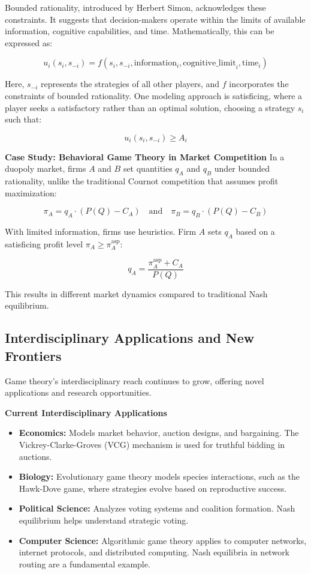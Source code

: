 \documentclass[12pt]{book} %
\begin{document}
Bounded rationality, introduced by Herbert Simon, acknowledges these constraints. It suggests that decision-makers operate within the limits of available information, cognitive capabilities, and time. Mathematically, this can be expressed as:

\[
u_i(s_i, s_{-i}) = f(s_i, s_{-i}, \text{information}_i, \text{cognitive\_limit}_i, \text{time}_i)
\]

Here, $s_{-i}$ represents the strategies of all other players, and $f$ incorporates the constraints of bounded rationality. One modeling approach is satisficing, where a player seeks a satisfactory rather than an optimal solution, choosing a strategy $s_i$ such that:

\[
u_i(s_i, s_{-i}) \geq A_i
\]

\textbf{Case Study: Behavioral Game Theory in Market Competition}
In a duopoly market, firms $A$ and $B$ set quantities $q_A$ and $q_B$ under bounded rationality, unlike the traditional Cournot competition that assumes profit maximization:

\[
\pi_A = q_A \cdot (P(Q) - C_A) \quad \text{and} \quad \pi_B = q_B \cdot (P(Q) - C_B)
\]

With limited information, firms use heuristics. Firm $A$ sets $q_A$ based on a satisficing profit level $\pi_A \geq \pi_A^{\text{asp}}$:

\[
q_A = \frac{\pi_A^{\text{asp}} + C_A}{P(Q)}
\]

This results in different market dynamics compared to traditional Nash equilibrium.

\subsection{Interdisciplinary Applications and New Frontiers}
Game theory's interdisciplinary reach continues to grow, offering novel applications and research opportunities.

\textbf{Current Interdisciplinary Applications}
\begin{itemize}
    \item \textbf{Economics:} Models market behavior, auction designs, and bargaining. The Vickrey-Clarke-Groves (VCG) mechanism is used for truthful bidding in auctions.
    \item \textbf{Biology:} Evolutionary game theory models species interactions, such as the Hawk-Dove game, where strategies evolve based on reproductive success.
    \item \textbf{Political Science:} Analyzes voting systems and coalition formation. Nash equilibrium helps understand strategic voting.
    \item \textbf{Computer Science:} Algorithmic game theory applies to computer networks, internet protocols, and distributed computing. Nash equilibria in network routing are a fundamental example.
\end{itemize}
\end{document}
